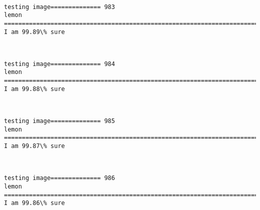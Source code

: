 \documentclass[11pt]{article}
\begin{document}
    \begin{center}
    \end{center}
    { \hspace*{\fill} \\}
    
    \begin{Verbatim}[commandchars=\\\{\}]
testing image============== 983
lemon
============================================================================
I am 99.89\% sure

    \end{Verbatim}

    \begin{center}
    \end{center}
    { \hspace*{\fill} \\}
    
    \begin{Verbatim}[commandchars=\\\{\}]
testing image============== 984
lemon
============================================================================
I am 99.88\% sure

    \end{Verbatim}

    \begin{center}
    \end{center}
    { \hspace*{\fill} \\}
    
    \begin{Verbatim}[commandchars=\\\{\}]
testing image============== 985
lemon
============================================================================
I am 99.87\% sure

    \end{Verbatim}

    \begin{center}
    \end{center}
    { \hspace*{\fill} \\}
    
    \begin{Verbatim}[commandchars=\\\{\}]
testing image============== 986
lemon
============================================================================
I am 99.86\% sure

    \end{Verbatim}
\end{document}
